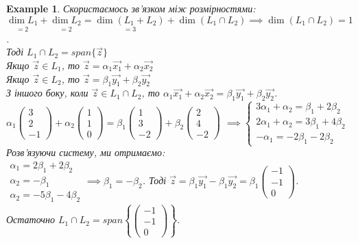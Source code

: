 \documentclass[a4paper, 10pt]{article}
\theoremstyle{theoremdd}
\theoremstyle{theoremdd}
\theoremstyle{theoremdd}
\theoremstyle{theoremdd}
\newtheorem{example}[theorem]{Example}
\theoremstyle{theoremdd}
\theoremstyle{theoremdd}
\theoremstyle{theoremdd}
\theoremstyle{theoremdd}
\begin{document}
\begin{example}
	Скористаємось зв'язком між розмірностями:\\
	$\underset{=2}{\dim L_1} + \underset{=2}{\dim L_2} = \underset{=3}{\dim (L_1+L_2)} + \dim(L_1 \cap L_2) \implies \dim (L_1 \cap L_2) = 1$.\\
	Тоді $L_1 \cap L_2 = span\{\vec{z}\}$\\
	Якщо $\vec{z} \in L_1$, то $\vec{z} = \alpha_1 \vec{x_1} + \alpha_2 \vec{x_2}$\\
	Якщо $\vec{z} \in L_2$, то $\vec{z} = \beta_1 \vec{y_1} + \beta_2 \vec{y_2}$\\
	З іншого боку, коли $\vec{z} \in L_1 \cap L_2$, то $\alpha_1 \vec{x_1} + \alpha_2 \vec{x_2} = \beta_1 \vec{y_1} + \beta_2 \vec{y_2}$.\\
	$\alpha_1 \begin{pmatrix} 3 \\ 2 \\ -1 \end{pmatrix} + \alpha_2 \begin{pmatrix} 1 \\ 1 \\ 0 \end{pmatrix} = \beta_1 \begin{pmatrix} 1 \\ 3 \\ -2 \end{pmatrix} + \beta_2 \begin{pmatrix} 2 \\ 4 \\ -2 \end{pmatrix}$
	$\implies \begin{cases}
	3 \alpha_1 + \alpha_2 = \beta_1 + 2 \beta_2 \\
	2 \alpha_1 + \alpha_2 = 3 \beta_1 + 4 \beta_2 \\
	- \alpha_1 = -2 \beta_1 - 2 \beta_2
	\end{cases}$\\
	Розв'язуючи систему, ми отримаємо:\\
	$\begin{gathered}
	\alpha_1 = 2\beta_1 + 2\beta_2 \\
	\alpha_2 = -\beta_1 \\
	\alpha_2 = -5\beta_1 - 4\beta_2
	\end{gathered} \implies \beta_1 = -\beta_2$. Тоді $\vec{z} =\beta_1 \vec{y_1} - \beta_1 \vec{y_2} = \beta_1 \begin{pmatrix} -1 \\ -1 \\ 0 \end{pmatrix}$.\\
	Остаточно $L_1 \cap L_2 = span\left\{ \begin{pmatrix} -1 \\ -1 \\ 0 \end{pmatrix} \right\}$.
	\end{example}
	
\end{document}

